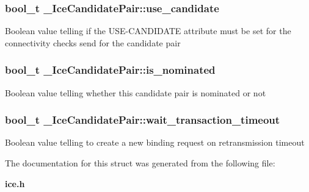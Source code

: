 \subsubsection[{use\_\-candidate}]{\setlength{\rightskip}{0pt plus 5cm}bool\_\-t {\bf \_\-IceCandidatePair::use\_\-candidate}}\label{struct__IceCandidatePair_ade0f25dd51aeddca137f9733fded3f8e}
Boolean value telling if the USE-\/CANDIDATE attribute must be set for the connectivity checks send for the candidate pair 
\subsubsection[{is\_\-nominated}]{\setlength{\rightskip}{0pt plus 5cm}bool\_\-t {\bf \_\-IceCandidatePair::is\_\-nominated}}\label{struct__IceCandidatePair_aaa24f39a17b3715384256822dc40a1f6}
Boolean value telling whether this candidate pair is nominated or not 
\subsubsection[{wait\_\-transaction\_\-timeout}]{\setlength{\rightskip}{0pt plus 5cm}bool\_\-t {\bf \_\-IceCandidatePair::wait\_\-transaction\_\-timeout}}\label{struct__IceCandidatePair_a427bbb087d9ed087d3388e4e4e3af46c}
Boolean value telling to create a new binding request on retransmission timeout 

The documentation for this struct was generated from the following file:\begin{DoxyCompactItemize}
\item 
{\bf ice.h}\end{DoxyCompactItemize}
